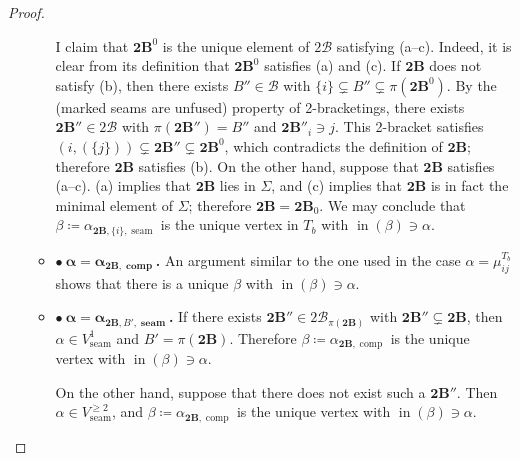 \documentclass[11pt]{amsart}
\theoremstyle{definition}
\theoremstyle{remark}
\theoremstyle{plain}
\newcommand{\btB}{{\mathbf{2B}}}
\newcommand{\sB}{\mathscr{B}}
\newcommand{\stB}{2\mathscr{B}}
\newcommand{\on}{\operatorname}
\newcommand{\comp}{C^2}
\renewcommand{\comp}{{\on{comp}}}
\newcommand{\seam}{{\on{seam}}}
\newcommand{\incom}{\on{in}}
\begin{document}
\begin{proof}
\begin{itemize}
\begin{itemize}
I claim that $\btB^0$ is the unique element of $\stB$ satisfying (a--c).
Indeed, it is clear from its definition that $\btB^0$ satisfies (a) and (c).
If $\btB$ does not satisfy (b), then there exists $B'' \in \sB$ with $\{i\} \subsetneq B'' \subsetneq \pi(\btB^0)$.
By the {\sc(marked seams are unfused)} property of 2-bracketings, there exists $\btB'' \in \stB$ with $\pi(\btB'') = B''$ and $\btB''_i \ni j$.
This 2-bracket satisfies $(i,(\{j\})) \subsetneq \btB'' \subsetneq \btB^0$, which contradicts the definition of $\btB$; therefore $\btB$ satisfies (b).
On the other hand, suppose that $\btB$ satisfies (a--c).
(a) implies that $\btB$ lies in $\Sigma$, and (c) implies that $\btB$ is in fact the minimal element of $\Sigma$; therefore $\btB = \btB_0$.
We may conclude that $\beta \coloneqq \alpha_{\btB,\{i\},\seam}$ is the unique vertex in $T_b$ with $\incom(\beta) \ni \alpha$.

\item[] {\bf $\bullet \: \mathbf{\alpha = \alpha_{\btB,\comp}}$.} An argument similar to the one used in the case $\alpha = \mu_{ij}^{T_b}$ shows that there is a unique $\beta$ with $\incom(\beta) \ni \alpha$.

\item[] {\bf $\bullet \: \mathbf{\alpha = \alpha_{\btB,\mathit{B'},\seam}}$.} If there exists $\btB'' \in \stB_{\pi(\btB)}$ with $\btB'' \subsetneq \btB$, then $\alpha \in V_\seam^1$ and $B' = \pi(\btB)$.
Therefore $\beta \coloneqq \alpha_{\btB,\comp}$ is the unique vertex with $\incom(\beta) \ni \alpha$.

On the other hand, suppose that there does not exist such a $\btB''$.
Then $\alpha \in V_\seam^{\geq2}$, and $\beta \coloneqq \alpha_{\btB,\comp}$ is the unique vertex with $\incom(\beta) \ni \alpha$.
\end{itemize}


\end{itemize}
\end{proof}
\end{document}
